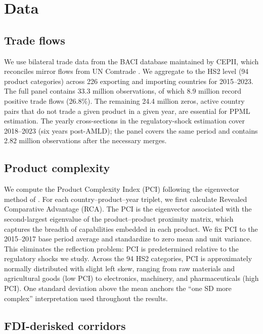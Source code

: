 \section{Data}
\label{sec:data}

\subsection{Trade flows}

We use bilateral trade data from the BACI database maintained by CEPII, which reconciles mirror flows from UN Comtrade \citep{Head2014_gravity}. We aggregate to the HS2 level (94 product categories) across 226 exporting and importing countries for 2015--2023. The full panel contains 33.3 million observations, of which 8.9 million record positive trade flows (26.8\%). The remaining 24.4 million zeros, active country pairs that do not trade a given product in a given year, are essential for PPML estimation. The yearly cross-sections in the regulatory-shock estimation cover 2018--2023 (six years post-AMLD); the panel covers the same period and contains 2.82 million observations after the necessary merges.

\subsection{Product complexity}

We compute the Product Complexity Index (PCI) following the eigenvector method of \citet{Hidalgo2009_building_blocks}. For each country--product--year triplet, we first calculate Revealed Comparative Advantage (RCA). The PCI is the eigenvector associated with the second-largest eigenvalue of the product--product proximity matrix, which captures the breadth of capabilities embedded in each product. We fix PCI to the 2015--2017 base period average and standardize to zero mean and unit variance. This eliminates the reflection problem: PCI is predetermined relative to the regulatory shocks we study. Across the 94 HS2 categories, PCI is approximately normally distributed with slight left skew, ranging from raw materials and agricultural goods (low PCI) to electronics, machinery, and pharmaceuticals (high PCI). One standard deviation above the mean anchors the ``one SD more complex'' interpretation used throughout the results.

\subsection{FDI-derisked corridors}

